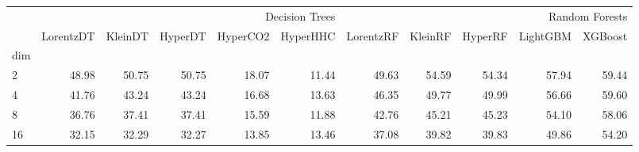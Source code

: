 \begin{tabular}{lrrrrrrrrrr}
 & \multicolumn{5}{r}{Decision Trees} & \multicolumn{5}{r}{Random Forests} \\
 & LorentzDT & KleinDT & HyperDT & HyperCO2 & HyperHHC & LorentzRF & KleinRF & HyperRF & LightGBM & XGBoost \\
dim &  &  &  &  &  &  &  &  &  &  \\
2 & {\cellcolor[HTML]{2F984F}} \color[HTML]{F1F1F1} 48.98 & {\cellcolor[HTML]{238B45}} \color[HTML]{F1F1F1} 50.75 & {\cellcolor[HTML]{238B45}} \color[HTML]{F1F1F1} 50.75 & {\cellcolor[HTML]{F7FCF5}} \color[HTML]{000000} 18.07 & {\cellcolor[HTML]{F7FCF5}} \color[HTML]{000000} 11.44 & {\cellcolor[HTML]{2B934B}} \color[HTML]{F1F1F1} 49.63 & {\cellcolor[HTML]{05712F}} \color[HTML]{F1F1F1} 54.59 & {\cellcolor[HTML]{067230}} \color[HTML]{F1F1F1} 54.34 & {\cellcolor[HTML]{005221}} \color[HTML]{F1F1F1} 57.94 & {\cellcolor[HTML]{00441B}} \color[HTML]{F1F1F1} 59.44 \\
4 & {\cellcolor[HTML]{7AC77B}} \color[HTML]{000000} 41.76 & {\cellcolor[HTML]{6ABF71}} \color[HTML]{000000} 43.24 & {\cellcolor[HTML]{6ABF71}} \color[HTML]{000000} 43.24 & {\cellcolor[HTML]{F7FCF5}} \color[HTML]{000000} 16.68 & {\cellcolor[HTML]{F7FCF5}} \color[HTML]{000000} 13.63 & {\cellcolor[HTML]{45AD5F}} \color[HTML]{F1F1F1} 46.35 & {\cellcolor[HTML]{2B934B}} \color[HTML]{F1F1F1} 49.77 & {\cellcolor[HTML]{2A924A}} \color[HTML]{F1F1F1} 49.99 & {\cellcolor[HTML]{005F26}} \color[HTML]{F1F1F1} 56.66 & {\cellcolor[HTML]{00441B}} \color[HTML]{F1F1F1} 59.60 \\
8 & {\cellcolor[HTML]{A7DBA0}} \color[HTML]{000000} 36.76 & {\cellcolor[HTML]{A0D99B}} \color[HTML]{000000} 37.41 & {\cellcolor[HTML]{A0D99B}} \color[HTML]{000000} 37.41 & {\cellcolor[HTML]{F7FCF5}} \color[HTML]{000000} 15.59 & {\cellcolor[HTML]{F7FCF5}} \color[HTML]{000000} 11.88 & {\cellcolor[HTML]{65BD6F}} \color[HTML]{F1F1F1} 42.76 & {\cellcolor[HTML]{46AE60}} \color[HTML]{F1F1F1} 45.21 & {\cellcolor[HTML]{46AE60}} \color[HTML]{F1F1F1} 45.23 & {\cellcolor[HTML]{006B2B}} \color[HTML]{F1F1F1} 54.10 & {\cellcolor[HTML]{00441B}} \color[HTML]{F1F1F1} 58.06 \\
16 & {\cellcolor[HTML]{C9EAC2}} \color[HTML]{000000} 32.15 & {\cellcolor[HTML]{C8E9C1}} \color[HTML]{000000} 32.29 & {\cellcolor[HTML]{C8E9C1}} \color[HTML]{000000} 32.27 & {\cellcolor[HTML]{F7FCF5}} \color[HTML]{000000} 13.85 & {\cellcolor[HTML]{F7FCF5}} \color[HTML]{000000} 13.46 & {\cellcolor[HTML]{94D390}} \color[HTML]{000000} 37.08 & {\cellcolor[HTML]{72C375}} \color[HTML]{000000} 39.82 & {\cellcolor[HTML]{70C274}} \color[HTML]{000000} 39.83 & {\cellcolor[HTML]{077331}} \color[HTML]{F1F1F1} 49.86 & {\cellcolor[HTML]{00441B}} \color[HTML]{F1F1F1} 54.20 \\

\end{tabular}
